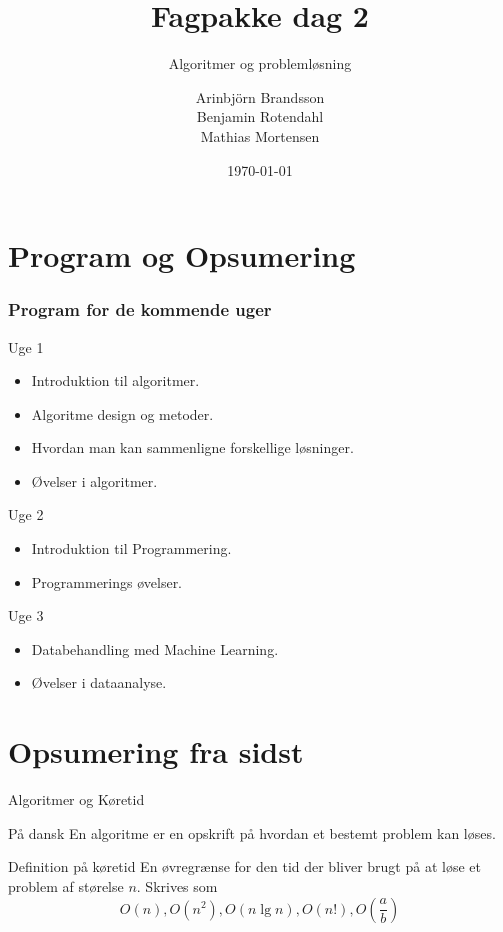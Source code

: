 \documentclass[12pt,t]{beamer}
\title{Fagpakke dag 2}
\subtitle{Algoritmer og problemløsning}
\author{
        Arinbjörn Brandsson \\
        Benjamin Rotendahl  \\
        Mathias Mortensen
}
\date[]{\today}
\begin{document}
\frame[plain]{\titlepage}
 \frame{\tableofcontents}

\section{Program og Opsumering}

\begin{frame}
    \frametitle{Program for de kommende uger}
    \begin{block}{Uge 1}
        \begin{itemize}
            \item Introduktion til algoritmer.
            \item Algoritme design og metoder.
            \item Hvordan man kan sammenligne forskellige løsninger.
            \item Øvelser i algoritmer.
        \end{itemize}
    \end{block}
    \pause
    \begin{block}{Uge 2}
        \begin{itemize}
            \item \alert{Introduktion til Programmering.}
            \item \alert{Programmerings øvelser.}
        \end{itemize}
    \end{block}
    \pause
    \begin{block}{Uge 3}
        \begin{itemize}
            \item Databehandling med Machine Learning.
            \item Øvelser i dataanalyse.
        \end{itemize}
    \end{block}
\end{frame}


\section{Opsumering fra sidst}
    \begin{frame}[c]{Algoritmer og Køretid}
        \begin{block}{På dansk}
            En algoritme er en \alert{opskrift} på hvordan et bestemt problem
            kan løses.
        \end{block}
        \pause
        \begin{block}{Definition på køretid}
            En øvregrænse for den tid der bliver brugt på at løse et problem af
            størelse $n$. Skrives som
            $$
                O(n), O(n^2), O(n \lg n), O(n!), O\left( \frac{a}{b} \right)
            $$
        \end{block}
    \end{frame}
\end{document}
